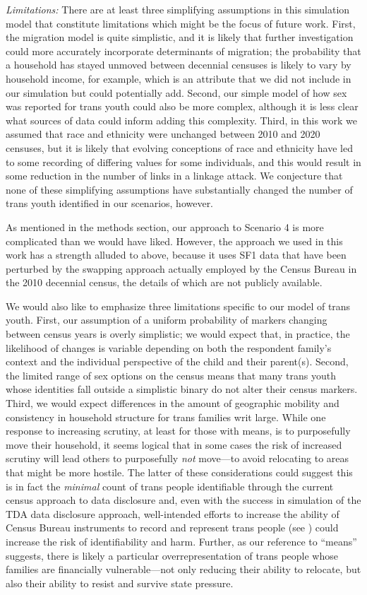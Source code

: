 \documentclass{jpc} %
\theoremstyle{plain}\newtheorem{satz}[thm]{Satz} %
\begin{document}
\emph{Limitations:}
There are at least three simplifying assumptions in this simulation model that constitute limitations which might be the focus of future work.  First, the migration model is quite simplistic, and it is likely that further investigation could more accurately incorporate determinants of migration; the probability that a household has stayed unmoved between decennial censuses is likely to vary by household income, for example, which is an attribute that we did not include in our simulation but could potentially add.
Second, our simple model of how sex was reported for trans youth could also be more complex, although it is less clear what sources of data could inform adding this complexity. Third, in this work we assumed that race and ethnicity were unchanged between 2010 and 2020 censuses, but it is likely that evolving conceptions of race and ethnicity have led to some recording of differing values for some individuals, and this would result in some reduction in the number of links in a linkage attack.  We conjecture that none of these simplifying assumptions have substantially changed the number of trans youth identified in our scenarios, however.

As mentioned in the methods section, our approach to Scenario 4 is more complicated than we would have liked.  However, the approach we used in this work has a strength alluded to above, because it uses SF1 data that have been perturbed by the swapping approach actually employed by the Census Bureau in the 2010 decennial census, the details of which are not publicly available.

We would also like to emphasize three limitations specific to our model of trans youth. First, our assumption of a uniform probability of markers changing between census years is overly simplistic; we would expect that, in practice, the likelihood of changes is variable depending on both the respondent family's context and the individual perspective of the child and their parent(s). Second, the limited range of sex options on the census means that many trans youth whose identities fall outside a simplistic binary do not alter their census markers. Third, we would expect differences in the amount of geographic mobility and consistency in household structure for trans families writ large. While one response to increasing scrutiny, at least for those with means, is to purposefully move their household, it seems logical that in some cases the risk of increased scrutiny will lead others to purposefully \emph{not} move---to avoid relocating to areas that might be more hostile. The latter of these considerations could  suggest this is in fact the \textit{minimal} count of trans people identifiable through the current census approach to data disclosure and, even with the success in simulation of the TDA data disclosure approach, well-intended efforts to increase the ability of Census Bureau instruments to record and represent trans people (see \cite{whfactsheet}) could  increase the risk of identifiability and harm. Further, as our reference to ``means'' suggests, there is likely a particular overrepresentation of trans people whose families are financially vulnerable---not only reducing their ability to relocate, but also their ability to resist and survive state pressure.
\end{document}
